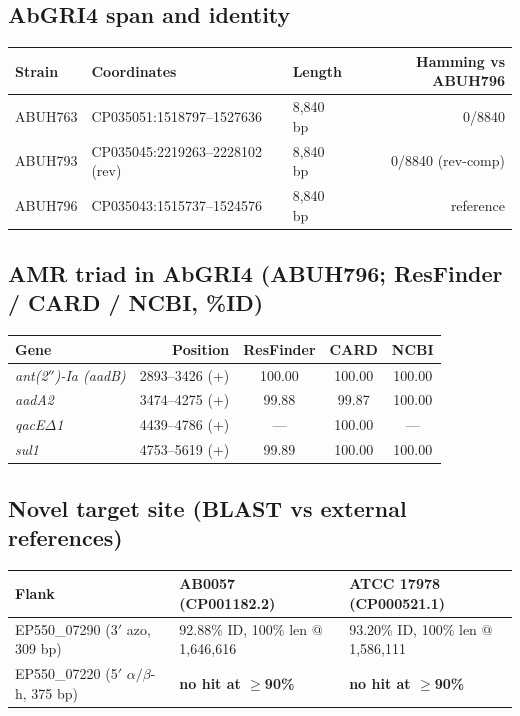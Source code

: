 \documentclass[11pt]{article}
\begin{document}
\subsection{AbGRI4 span and identity}
\begin{tabular}{@{}lllr@{}}\toprule
Strain & Coordinates & Length & Hamming vs ABUH796 \\ \midrule
ABUH763 & CP035051:1518797--1527636       & 8{,}840 bp & 0/8840 \\
ABUH793 & CP035045:2219263--2228102 (rev) & 8{,}840 bp & 0/8840 (rev-comp) \\
ABUH796 & CP035043:1515737--1524576       & 8{,}840 bp & reference \\
\bottomrule
\end{tabular}

\subsection{AMR triad in AbGRI4 (ABUH796; ResFinder / CARD / NCBI, \%ID)}
\begin{tabular}{@{}lrccc@{}}\toprule
Gene & Position & ResFinder & CARD & NCBI \\ \midrule
\textit{ant(2$''$)-Ia (aadB)} & 2893--3426 (+) & 100.00 & 100.00 & 100.00 \\
\textit{aadA2}                 & 3474--4275 (+) & 99.88  & 99.87  & 100.00 \\
\textit{qacE$\Delta$1}         & 4439--4786 (+) & ---    & 100.00 & --- \\
\textit{sul1}                  & 4753--5619 (+) & 99.89  & 100.00 & 100.00 \\
\bottomrule
\end{tabular}

\subsection{Novel target site (BLAST vs external references)}
\begin{tabular}{@{}lll@{}}\toprule
Flank & AB0057 (CP001182.2) & ATCC 17978 (CP000521.1) \\ \midrule
EP550\_07290 (3$'$ azo, 309 bp)  & 92.88\% ID, 100\% len @ 1{,}646{,}616 & 93.20\% ID, 100\% len @ 1{,}586{,}111 \\
EP550\_07220 (5$'$ $\alpha/\beta$-h, 375 bp) & \textbf{no hit at $\geq$90\%}      & \textbf{no hit at $\geq$90\%} \\
\bottomrule
\end{tabular}
\end{document}
